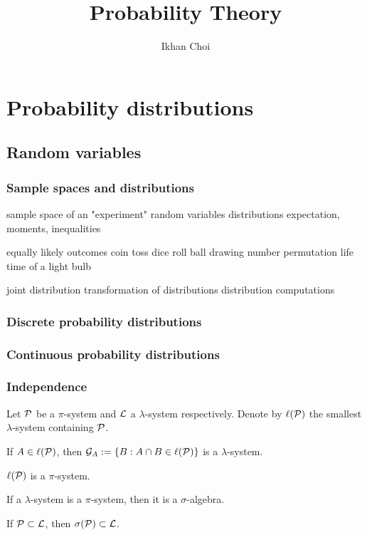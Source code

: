 \documentclass{../note}
\begin{document}
\title{Probability Theory}
\author{Ikhan Choi}
\maketitle
\tableofcontents


\part{Probability distributions}


\chapter{Random variables}

\section{Sample spaces and distributions}
sample space of an "experiment"
random variables
distributions
expectation, moments, inequalities

equally likely outcomes
	coin toss
	dice roll
	ball drawing
	number permutation
	life time of a light bulb

joint distribution
transformation of distributions
distribution computations

\section{Discrete probability distributions}

\section{Continuous probability distributions}

\section{Independence}

\begin{prb}
Let $\mathcal{P}$ be a $\pi$-system and $\mathcal{L}$ a $\lambda$-system respectively.
Denote by $\ell(\mathcal{P})$ the smallest $\lambda$-system containing $\mathcal{P}$.
\begin{parts}
\item If $A\in\ell(\mathcal{P})$, then $\mathcal{G}_A:=\{B:A\cap B\in\ell(\mathcal{P})\}$ is a $\lambda$-system.
\item $\ell(\mathcal{P})$ is a $\pi$-system.
\item If a $\lambda$-system is a $\pi$-system, then it is a $\sigma$-algebra.
\item If $\mathcal{P}\subset\mathcal{L}$, then $\sigma(\mathcal{P})\subset\mathcal{L}$.
\end{parts}
\end{prb}
\end{document}
